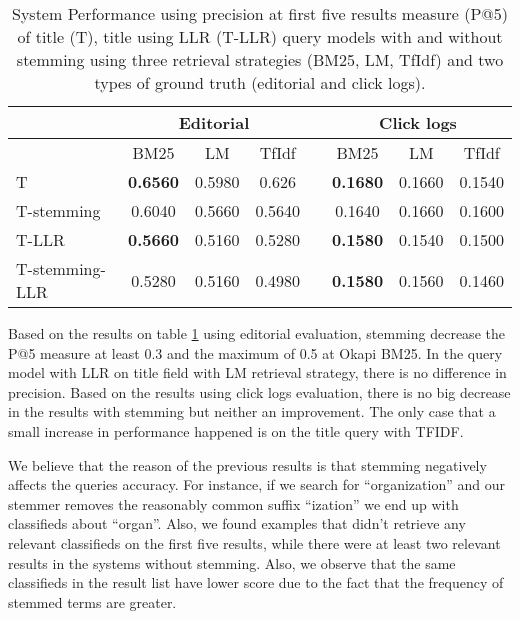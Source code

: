 \begin{table}[h]
\begin{center}
\caption{System Performance using precision at first five results measure (P@5) of title (T), title using LLR (T-LLR) query models with and without stemming using three retrieval strategies (BM25, LM, TfIdf) and two types of ground truth (editorial and click logs).}
\label{table:stemmSystems}
\begin{tabular}{lccccccc}
\toprule
 & \multicolumn{3}{c}{Editorial} & & \multicolumn{3}{c}{Click logs} \\
\midrule
 & BM25 & LM & TfIdf &   & BM25 & LM & TfIdf \\
\midrule
T &  \textbf{0.6560} &  0.5980 & 0.626 &   &            \textbf{0.1680} & 0.1660 & 0.1540 \\
T-stemming 	& 0.6040 & 0.5660 & 0.5640 &   &	 		0.1640 & 0.1660 & 0.1600 \\
T-LLR & \textbf{0.5660} & 0.5160 & 0.5280 &   &	 		\textbf{0.1580} & 0.1540 & 0.1500 \\
T-stemming-LLR & 0.5280 & 0.5160 & 0.4980 &   &	 		\textbf{0.1580} & 0.1560 & 0.1460 \\
\bottomrule
\end{tabular}
\end{center}
\end{table}




Based on the results on table \ref{table:stemmSystems} using editorial evaluation, stemming decrease the P@5 measure at least 0.3 and the maximum of 0.5 at Okapi BM25. In the query model with LLR on title field with LM retrieval strategy, there is no difference in precision.
Based on the results using click logs evaluation, there is no big decrease in the results with stemming but neither an improvement. The only case that a small increase in performance happened is on the title query with TFIDF.

We believe that the reason of the previous results is that stemming negatively affects the queries accuracy. For instance, if we search for ``organization'' and our stemmer removes the reasonably common suffix ``ization'' we end up with classifieds about ``organ''. Also, we found examples that didn't retrieve any relevant classifieds on the first five results, while there were at least two relevant results in the systems without stemming. Also, we observe that the same classifieds in the result list have lower score due to the fact that the frequency of stemmed terms are greater.


